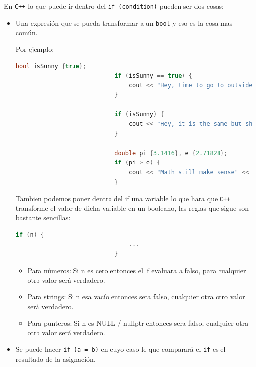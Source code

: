 \documentclass[12pt, fleqn]{report}                             %
\theoremstyle{break}                                            %
\newcommand{\textCode}[1]  { \texttt{#1} }                      %
\newcommand \Cpp  {\textCode{C++} }                               %
\begin{document}
                En \Cpp lo que puede ir dentro del \textCode{if (condition)} pueden ser dos cosas:
                \begin{itemize}
                    \item Una expresión que se pueda transformar a un \textCode{bool} y eso es la cosa
                        mas común.

                        Por ejemplo:
                        \begin{lstlisting}[language=C++, gobble=28]
                            bool isSunny {true};
                            if (isSunny == true) {
                                cout << "Hey, time to go to outside" << endl;
                            }

                            if (isSunny) {
                                cout << "Hey, it is the same but shorter syntax" << endl;
                            }

                            double pi {3.1416}, e {2.71828};
                            if (pi > e) {
                                cout << "Math still make sense" << endl;
                            }
                        \end{lstlisting}

                        Tambien podemos poner dentro del if una variable lo que hara
                        que \Cpp transforme el valor de dicha variable en un booleano,
                        las reglas que sigue son bastante sencillas:
                        \begin{lstlisting}[language=C++, gobble=28]
                            if (n) {
                                ...
                            }
                        \end{lstlisting}
                        \begin{itemize}
                            \item Para números: Si n es cero entonces el if evaluara a falso, para
                                cualquier otro valor será verdadero. 
                            \item Para strings: Si n esa vacío entonces sera falso, cualquier otra
                                otro valor será verdadero. 
                            \item Para punteros: Si n es NULL / nullptr entonces sera falso, cualquier otra
                                otro valor será verdadero. 
                        \end{itemize}

                    \item Se puede hacer \textCode{if (a = b)} en cuyo caso lo que comparará el 
                        \textCode{if} es el resultado de la asignación.
                \end{itemize}
\end{document}
